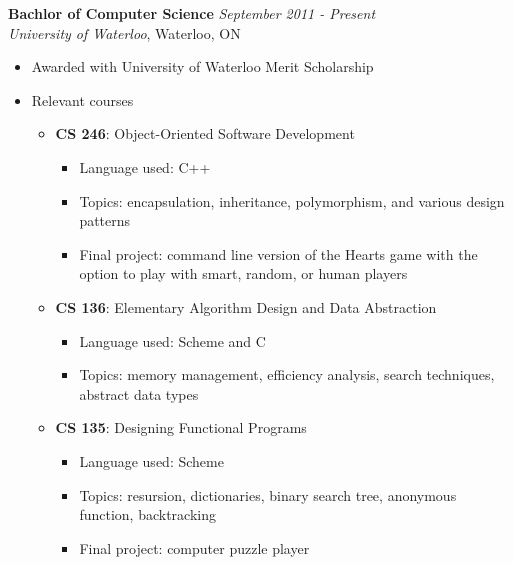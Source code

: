 \documentclass[9pt]{article}
\newenvironment{changemargin}[2]{%
  \begin{list}{}{%
    \setlength{\topsep}{0pt}%
    \setlength{\leftmargin}{#1}%
    \setlength{\rightmargin}{#2}%
    \setlength{\listparindent}{\parindent}%
    \setlength{\itemindent}{\parindent}%
    \setlength{\parsep}{\parskip}%
  }%
  \item[]}{\end{list}
}
\newenvironment{body} {
	\vspace*{-16pt}
	\begin{changemargin}{-0.25in}{-0.5in}
  }	
	{\end{changemargin}
}
\begin{document}
\begin{body}
	\vspace{14pt}
	\textbf{Bachlor of Computer Science}{} \hfill \emph{September 2011 - Present}{} \\
	\emph{University of Waterloo}, Waterloo, ON{} \\
	\begin{itemize}
		\item Awarded with University of Waterloo Merit Scholarship
		\item Relevant courses\\
		\begin{itemize}
			\item \textbf{CS 246}: Object-Oriented Software Development
				\begin{itemize}
					\item Language used: C++
					\item Topics: encapsulation, inheritance, polymorphism, and various design patterns
					\item Final project: command line version of the Hearts game with the option to play with smart, random, or human players
				\end{itemize} \smallskip
			\item \textbf{CS 136}: Elementary Algorithm Design and Data Abstraction
				\begin{itemize}
					\item Language used: Scheme and C
					\item Topics: memory management, efficiency analysis, search techniques, abstract data types
				\end{itemize} \smallskip
			\item \textbf{CS 135}: Designing Functional Programs
				\begin{itemize}
					\item Language used: Scheme
					\item Topics: resursion, dictionaries, binary search tree, anonymous function, backtracking
					\item Final project: computer puzzle player
				\end{itemize}
		\end{itemize}
	\end{itemize}
  \medskip

\end{body}

\smallskip
\end{document}
